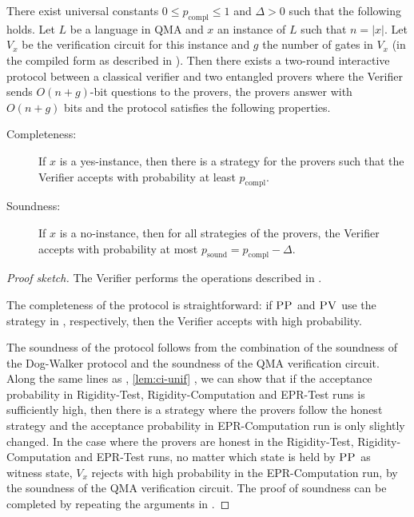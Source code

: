 \documentclass{toc}
\DeclareMathOperator{\sound}{sound}
\DeclareMathOperator{\compl}{compl}
\newcommand{\pv}{\textsc{PV}}
\newcommand{\pp}{\textsc{PP}}
\begin{document}
\begin{lemma}\label{lem:qma}
There %
exist  %
universal constants
%
$0\leq p_{\compl}\leq 1$   %
and $\Delta >0$ such that the following holds. 
Let $L$ be a language in QMA and $x$ an instance of $L$ such that $n = |x|$. Let  $V_x$ be the
  verification circuit for this instance and $g$ the number of gates in $V_x$
  (in the compiled form as described in ). Then there exists a two-round interactive protocol
between a classical verifier and two entangled provers where the Verifier
sends  $O(n + g)$-bit questions to the provers, the provers answer with $O(n + g)$ bits and the protocol satisfies the following properties.
\begin{description}
\item[Completeness:] If $x$ is a yes-instance, then  there is a strategy for the provers such that the Verifier accepts with probability  at least
%
$p_{\compl}$.
\item[Soundness:] If $x$ is a no-instance, then for all strategies of the provers, the Verifier accepts with  probability at most
%
$p_{\sound} = p_{\compl} - \Delta$.  %
\end{description}
\end{lemma}
\begin{proof}[Proof sketch]
The Verifier performs the operations described in . 

  The completeness of the protocol is straightforward: if $\pp$ and $\pv$ use the strategy in  , respectively, then the Verifier accepts with  high probability.

  The soundness of the protocol follows from the combination of the soundness of the
  Dog-Walker protocol and the soundness of the QMA verification circuit. Along the same lines as 
  , \ref{lem:ci-unif} ,
  we can show that if
  the acceptance probability in Rigidity-Test, Rigidity-Computation and
  EPR-Test runs
  is sufficiently high, then there is a strategy where the provers follow the honest
  strategy and the acceptance probability in EPR-Computation run is only slightly
  changed.  
  In the case where the provers are honest in the Rigidity-Test, Rigidity-Computation and EPR-Test runs, no matter which state is held
  by $\pp$ as witness state, $V_x$ rejects with high probability in the EPR-Computation run, by the
  soundness of the QMA verification circuit.  The proof of soundness can be completed by repeating the
  arguments in .
\end{proof}
\end{document}
